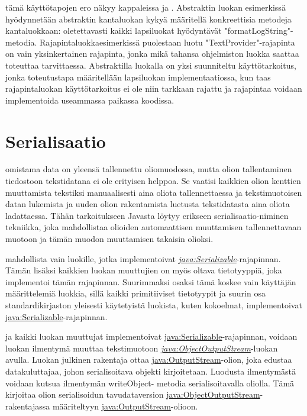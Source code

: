 \documentclass[a4paper,justified,notoc]{tufte-book}
\newcommand{\java}[1]{\underline{\gls{java:#1}}}
\newcommand{\newjava}[1]{\textit{\java{#1}}}
\begin{document}
\begin{fullwidth}
 tämä käyttötapojen ero näkyy kappaleissa 
ja . Abstraktin luokan esimerkissä hyödynnetään abstraktin kantaluokan kykyä
määritellä konkreettisia metodeja kantaluokkaan: oletettavasti kaikki lapsiluokat hyödyntävät
"formatLogString"-metodia. Rajapintaluokkaesimerkissä puolestaan luotu "TextProvider"-rajapinta
on vain yksinkertainen rajapinta, jonka mikä tahansa ohjelmiston luokka saattaa toteuttaa
tarvittaessa. Abstraktilla luokalla on yksi suunniteltu käyttötarkoitus, jonka toteutustapa
määritellään lapsiluokan implementaatiossa, kun taas rajapintaluokan käyttötarkoitus ei ole niin
tarkkaan rajattu ja rajapintaa voidaan implementoida useammassa paikassa koodissa.


\section{Serialisaatio}
\label{serialisaatio}

 omistama data on yleensä tallennettu oliomuodossa, mutta olion
tallentaminen tiedostoon tekstidatana ei ole erityisen helppoa. Se vaatisi kaikkien olion kenttien
muuttamista tekstiksi manuaalisesti aina oliota tallennettaessa ja tekstimuotoisen datan lukemista
ja uuden olion rakentamista luetusta tekstidatasta aina oliota ladattaessa. Tähän tarkoitukseen
Javasta löytyy erikseen \gls{serialisaatio}-niminen tekniikka, joka mahdollistaa olioiden
automaattisen muuttamisen tallennettavaan muotoon ja tämän muodon muuttamisen takaisin olioksi.

 mahdollista vain luokille, jotka implementoivat
\newjava{Serializable}-rajapinnan. Tämän lisäksi kaikkien luokan muuttujien on myös oltava
tietotyyppiä, joka implementoi tämän rajapinnan. Suurimmaksi osaksi tämä koskee vain käyttäjän
määrittelemiä luokkia, sillä kaikki primitiiviset tietotyypit ja suurin osa standardikirjaston
yleisesti käytetyistä luokista, kuten kokoelmat, implementoivat \java{Serializable}-rajapinnan.

 ja kaikki luokan muuttujat implementoivat \java{Serializable}-rajapinnan,
voidaan luokan ilmentymä muuttaa tekstimuotoon \newjava{ObjectOutputStream}-luokan avulla.
Luokan julkinen rakentaja ottaa \java{OutputStream}-olion, joka edustaa datakuluttajaa, johon
serialisoitava objekti kirjoitetaan. Luodusta ilmentymästä voidaan kutsua ilmentymän writeObject-
metodia serialisoitavalla oliolla. Tämä kirjoitaa olion serialisoidun tavudataversion
\java{ObjectOutputStream}-rakentajassa määriteltyyn \java{OutputStream}-olioon.


\end{fullwidth}
\end{document}
